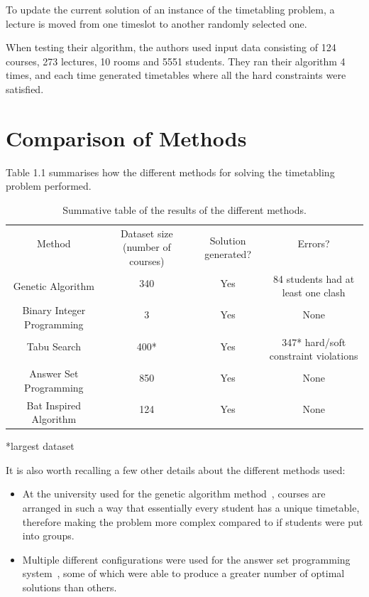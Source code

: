 \documentclass[a4paper, 12pt]{report}
\begin{document}
To update the current solution of an instance of the timetabling problem, a
lecture is moved from one timeslot to another randomly selected one.

When testing their algorithm, the authors used input data consisting of 
124 courses, 273 lectures, 10 rooms and 5551 students. They ran their algorithm 
4 times, and each time generated timetables where all the hard constraints were
satisfied.

\newpage

\section{Comparison of Methods}

Table 1.1 summarises how the different methods for solving the timetabling
problem performed.

\begin{table}
	\begin{tabular}{cccc}
		\toprule
		Method 
			& \multirow{2}{9em}{Dataset size (number of courses)}
			& \multirow{2}{6em}{Solution generated?}
			& Errors? \\
		\\
		\midrule
		\multirow{2}{10em}{Genetic Algorithm\cite{ga_example}}
			& 340
			& Yes 
			& \multirow{2}{9em}{84 students had at least one clash} \\
		\\
		\multirow{2}{10em}{Binary Integer Programming\cite{bip_example}}
			& 3
			& Yes
			& None \\
		\\
		\multirow{1}{10em}{Tabu Search\cite{tabu_example}}
			& 400*
			& Yes 
			& \multirow{2}{9em}{347* hard/soft constraint violations} \\
		\\
		\multirow{2}{10em}{Answer Set Programming\cite{asp_example}}
			& 850
			& Yes 
			& None \\
		\\
		\multirow{2}{10em}{Bat Inspired Algorithm\cite{ba_example}}
			& 124
			& Yes
			& None \\
		\\
		\bottomrule
	\end{tabular}
	\caption{\label{method-comparison}Summative table of the results of the 
		different methods.}
\end{table}
*largest dataset

It is also worth recalling a few other details about the different methods used:
\begin{itemize}
	\item At the university used for the genetic algorithm 
		method~\cite{ga_example}, courses are arranged in such a way that 
		essentially every student has a unique timetable, therefore making the 
		problem more complex compared to if students were put into groups.
	\item Multiple different configurations were used for the answer set 
		programming system~\cite{asp_example}, some of which were able to 
		produce a greater number of optimal solutions than others.
\end{itemize}
\end{document}
